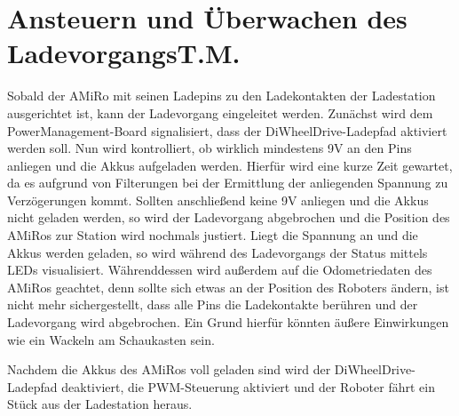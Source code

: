 \section[Ansteuern und Überwachen des Ladevorgangs]{Ansteuern und Überwachen des Ladevorgangs\hfill {\normalsize T.M.}} %

Sobald der AMiRo mit seinen Ladepins zu den Ladekontakten der Ladestation ausgerichtet ist, kann der Ladevorgang eingeleitet werden.
Zunächst wird dem PowerManagement-Board signalisiert, dass der DiWheelDrive-Ladepfad aktiviert werden soll. Nun wird kontrolliert, ob wirklich mindestens 9V an den Pins anliegen und die Akkus aufgeladen werden. Hierfür wird eine kurze Zeit gewartet, da es aufgrund von Filterungen bei der Ermittlung der anliegenden Spannung zu Verzögerungen kommt. Sollten anschließend keine 9V anliegen und die Akkus nicht geladen werden, so wird der Ladevorgang abgebrochen und die Position des AMiRos zur Station wird nochmals justiert.
Liegt die Spannung an und die Akkus werden geladen, so wird während des Ladevorgangs der Status mittels LEDs visualisiert. 
Währenddessen wird außerdem auf die Odometriedaten des AMiRos geachtet, denn sollte sich etwas an der Position des Roboters ändern, ist nicht mehr sichergestellt, dass alle Pins die Ladekontakte berühren und der Ladevorgang wird abgebrochen. Ein Grund hierfür könnten äußere Einwirkungen wie ein Wackeln am Schaukasten sein.

Nachdem die Akkus des AMiRos voll geladen sind wird der DiWheelDrive-Ladepfad deaktiviert, die PWM-Steuerung aktiviert und der Roboter fährt ein Stück aus der Ladestation heraus.


